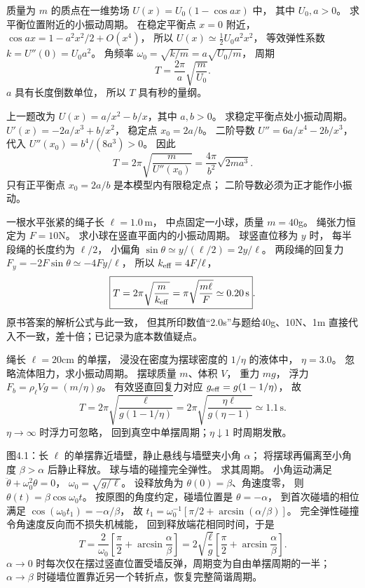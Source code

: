 质量为 $m$ 的质点在一维势场
$U(x)=U_0(1-\cos ax)$ 中，
其中 $U_0,a>0$。
求平衡位置附近的小振动周期。
\exsolution
在稳定平衡点 $x=0$ 附近，
$\cos ax=1-a^2x^2/2+O(x^4)$，
所以
$U(x)\simeq \tfrac12U_0a^2x^2$，
等效弹性系数
$k=U''(0)=U_0a^2$。
角频率
$\omega_0=\sqrt{k/m}=a\sqrt{U_0/m}$，
周期
\[
\boxed{T=\frac{2\pi}{a}\sqrt{\frac m{U_0}}}.
\]
\excheck $a$ 具有长度倒数单位，
所以 $T$ 具有秒的量纲。

上一题改为
$U(x)=a/x^2-b/x$，其中 $a,b>0$。
求稳定平衡点处小振动周期。
\exsolution
$U'(x)=-2a/x^3+b/x^2$，
稳定点
$x_0=2a/b$。
二阶导数
$U''=6a/x^4-2b/x^3$，
代入
$U''(x_0)=b^4/(8a^3)>0$。
因此
\[
\boxed{T=2\pi\sqrt{\frac{m}{U''(x_0)}}
=\frac{4\pi}{b^2}\sqrt{2ma^3}}.
\]
\excheck 只有正平衡点 $x_0=2a/b$
是本模型内有限稳定点；
二阶导数必须为正才能作小振动。

一根水平张紧的绳子长
$\ell=1.0\,\mathrm m$，
中点固定一小球，质量 $m=40$g。
绳张力恒定为 $F=10$N。
求小球在竖直平面内的小振动周期。
\exsolution
球竖直位移为 $y$ 时，
每半段绳的长度约为 $\ell/2$，
小偏角
$\sin\theta\simeq y/(\ell/2)=2y/\ell$。
两段绳的回复力
$F_y=-2F\sin\theta\simeq-4Fy/\ell$，
所以
$k_{\rm eff}=4F/\ell$，
\[
\boxed{T=2\pi\sqrt{\frac m{k_{\rm eff}}}
=\pi\sqrt{\frac{m\ell}{F}}
\simeq0.20\,\mathrm s}.
\]
\excheck 原书答案的解析公式与此一致，
但其所印数值“2.0s”与题给40g、10N、1m
直接代入不一致，差十倍；已记录为底本数值疑点。

绳长 $\ell=20$cm 的单摆，
浸没在密度为摆球密度的 $1/\eta$ 的液体中，
$\eta=3.0$。
忽略流体阻力，求小振动周期。
\exsolution
摆球质量 $m$、体积 $V$，
重力 $mg$，
浮力
$F_b=\rho_\ell Vg=(m/\eta)g$。
有效竖直回复力对应
$g_{\rm eff}=g(1-1/\eta)$，
故
\[
\boxed{T=2\pi\sqrt{
\frac{\ell}{g(1-1/\eta)}}
=2\pi\sqrt{\frac{\eta\ell}{g(\eta-1)}}
\simeq1.1\,\mathrm s}.
\]
\excheck $\eta\to\infty$ 时浮力可忽略，
回到真空中单摆周期；$\eta\downarrow1$ 时周期发散。

图4.1：长 $\ell$ 的单摆靠近墙壁，静止悬线与墙壁夹小角 $\alpha$；
将摆球再偏离至小角度 $\beta>\alpha$ 后静止释放。
球与墙的碰撞完全弹性。
求其周期。
\exsolution
小角运动满足
$\ddot\theta+\omega_0^2\theta=0$，
$\omega_0=\sqrt{g/\ell}$。
设释放角为 $\theta(0)=\beta$、角速度零，
则
$\theta(t)=\beta\cos\omega_0t$。
按原图的角度约定，碰墙位置是
$\theta=-\alpha$，
到首次碰墙的相位满足
$\cos(\omega_0t_1)=-\alpha/\beta$，
故
$t_1=\omega_0^{-1}[\pi/2+\arcsin(\alpha/\beta)]$。
完全弹性碰撞令角速度反向而不损失机械能，
回到释放端花相同时间，于是
\[
\boxed{T=\frac2{\omega_0}
\left[\frac\pi2+\arcsin\frac\alpha\beta\right]
=2\sqrt{\frac\ell g}
\left[\frac\pi2+\arcsin\frac\alpha\beta\right]}.
\]
\excheck $\alpha\to0$ 时每次仅在摆过竖直位置受墙反弹，周期变为自由单摆周期的一半；
$\alpha\to\beta$ 时碰墙位置靠近另一个转折点，恢复完整简谐周期。
